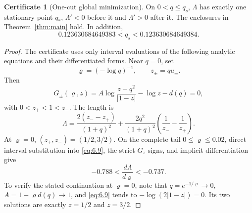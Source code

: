 \documentclass[11pt]{article}
\numberwithin{equation}{section}
\theoremstyle{plain}
\theoremstyle{definition}
\newtheorem{certificate}[theorem]{Certificate}
\theoremstyle{remark}
\newcommand{\1}{\mathbf 1}
\begin{document}
\begin{certificate}[One-cut global minimization]\label{comp:onecut}
On $0<q\le q_s$, $\Lambda$ has exactly one stationary point $q_*$,
$\Lambda'<0$ before it and $\Lambda'>0$ after it.  The enclosures in
Theorem~\ref{thm:main} hold.  In addition,
\[
 0.123630684649383<q_s<0.123630684649384.
\]
\end{certificate}

\begin{proof}
The certificate uses only interval evaluations of the following analytic
equations and their differentiated forms.  Near $q=0$, set
\[
 \varrho=(-\log q)^{-1},\qquad z_\pm=qu_\pm.
\]
Then
\begin{equation}
 G_\pm(\varrho,z)=A\log\frac{z-q^2}{|1-z|}-\log z-d(q)=0,
\label{eq:6.9}
\end{equation}
with $0<z_+<1<z_-$.  The length is
\begin{equation}
 \Lambda=\frac{2(z_--z_+)}{(1+q)^2}
 +\frac{2q^2}{(1+q)^2}\left(\frac1{z_-}-\frac1{z_+}\right).
\label{eq:6.10}
\end{equation}
At $\varrho=0$, $(z_+,z_-)=(1/2,3/2)$.  On the complete tail
$0\le\varrho\le0.02$, direct interval substitution into \eqref{eq:6.9}, the strict
$G_z$ signs, and implicit differentiation give
\[
 -0.788<\frac{d\Lambda}{d\varrho}<-0.737.
\]
To verify the stated continuation at $\varrho=0$, note that
$q=e^{-1/\varrho}\to0$, $A=1-\varrho d(q)\to1$, and \eqref{eq:6.9} tends to
$-\log(2|1-z|)=0$.  Its two solutions are exactly $z=1/2$ and $z=3/2$.


\end{proof}
\end{document}
